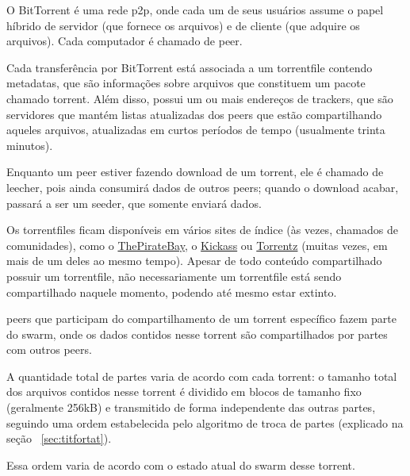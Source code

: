 
O BitTorrent é uma rede \gls{p2p}, onde cada um de seus usuários assume o papel híbrido
de servidor (que fornece os arquivos) e de cliente (que adquire os arquivos). Cada
computador é chamado de \gls{peer}.

Cada transferência por BitTorrent está associada a um \gls{torrentfile} contendo
\glspl{metadata}, que são informações sobre arquivos que constituem um pacote chamado
\gls{torrent}. Além disso, possui um ou mais endereços de \glspl{tracker}, que são
servidores que mantém listas atualizadas dos \glspl*{peer} que estão compartilhando
aqueles arquivos, atualizadas em curtos períodos de tempo (usualmente trinta minutos).

Enquanto um \gls*{peer} estiver fazendo download de um \gls*{torrent}, ele é chamado de
\gls{leecher}, pois ainda consumirá dados de outros \glspl*{peer}; quando o download
acabar, passará a ser um \gls{seeder}, que somente enviará dados.

Os \glspl*{torrentfile} ficam disponíveis em vários sites de índice (às vezes, chamados
de comunidades), como o \href{http://thepiratebay.sx/}{ThePirateBay}, o
\href{http://kickass.to/}{Kickass} ou \href{https://torrentz.eu/}{Torrentz} (muitas
vezes, em mais de um deles ao mesmo tempo). Apesar de todo conteúdo compartilhado
possuir um \gls*{torrentfile}, não necessariamente um \gls*{torrentfile} está sendo
compartilhado naquele momento, podendo até mesmo estar extinto.

\Glspl*{peer} que participam do compartilhamento de um \gls*{torrent} específico
fazem parte do \gls{swarm}, onde os dados contidos nesse \gls*{torrent} são
compartilhados por partes com outros \glspl*{peer}.

A quantidade total de partes varia de acordo com cada \gls*{torrent}: o tamanho total
dos arquivos contidos nesse \gls*{torrent} é dividido em blocos de tamanho fixo
(geralmente 256kB) e transmitido de forma independente das outras partes, seguindo uma
ordem estabelecida pelo algoritmo de troca de partes (explicado na seção
~\ref{sec:titfortat}).

Essa ordem varia de acordo com o estado atual do \gls*{swarm} desse \gls*{torrent}.

